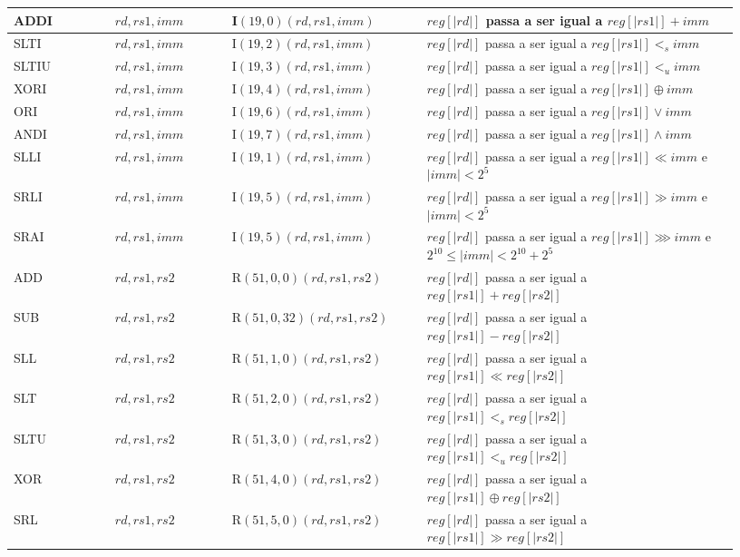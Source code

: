 \begin{table}
\begin{tabular}{ |p{0.13\linewidth}||p{0.15\linewidth}|p{0.25\linewidth}|p{0.40\linewidth}| }
ADDI & $rd, rs1, imm$ & I$(19, 0)(rd, rs1, imm)$ & $reg[|rd|]$ passa a ser igual a ${reg[|rs1|] + imm}$\\ \hline
SLTI & $rd, rs1, imm$ & I$(19, 2)(rd, rs1, imm)$ & $reg[|rd|]$ passa a ser igual a ${reg[|rs1|] <_s imm}$\\ \hline
SLTIU & $rd, rs1, imm$ & I$(19, 3)(rd, rs1, imm)$ & $reg[|rd|]$ passa a ser igual a ${reg[|rs1|] <_u imm}$\\ \hline
XORI & $rd, rs1, imm$ & I$(19, 4)(rd, rs1, imm)$ & $reg[|rd|]$ passa a ser igual a ${reg[|rs1|] \oplus imm}$\\ \hline
ORI & $rd, rs1, imm$ & I$(19, 6)(rd, rs1, imm)$ & $reg[|rd|]$ passa a ser igual a ${reg[|rs1|] \lor imm}$\\ \hline
ANDI & $rd, rs1, imm$ & I$(19, 7)(rd, rs1, imm)$ & $reg[|rd|]$ passa a ser igual a ${reg[|rs1|] \land imm}$ \\ \hline
SLLI & $rd, rs1, imm$ & I$(19, 1)(rd, rs1, imm)$ & $reg[|rd|]$ passa a ser igual a ${reg[|rs1|] \ll imm}$ e $|imm| < 2^5$ \\ \hline
SRLI & $rd, rs1, imm$ & I$(19, 5)(rd, rs1, imm)$ & $reg[|rd|]$ passa a ser igual a ${reg[|rs1|] \gg imm}$ e $|imm| < 2^5$\\ \hline
SRAI & $rd, rs1, imm$ & I$(19, 5)(rd, rs1, imm)$ & $reg[|rd|]$ passa a ser igual a ${reg[|rs1|] \ggg imm}$ e $2^{10} \leq |imm| < 2^{10} + 2^5$\\ \hline
ADD & $rd, rs1, rs2$ & R$(51, 0, 0)(rd, rs1, rs2)$ & $reg[|rd|]$ passa a ser igual a ${reg[|rs1|] + reg[|rs2|]}$ \\ \hline
SUB & $rd, rs1, rs2$ & R$(51, 0, 32)(rd, rs1, rs2)$ & $reg[|rd|]$ passa a ser igual a ${reg[|rs1|] - reg[|rs2|]}$ \\ \hline
SLL & $rd, rs1, rs2$ & R$(51, 1, 0)(rd, rs1, rs2)$ & $reg[|rd|]$ passa a ser igual a ${reg[|rs1|] \ll reg[|rs2|]}$ \\ \hline
SLT & $rd, rs1, rs2$ & R$(51, 2, 0)(rd, rs1, rs2)$ & $reg[|rd|]$ passa a ser igual a ${reg[|rs1|] <_s reg[|rs2|]}$ \\ \hline
SLTU & $rd, rs1, rs2$ & R$(51, 3, 0)(rd, rs1, rs2)$ & $reg[|rd|]$ passa a ser igual a ${reg[|rs1|] <_u reg[|rs2|]}$ \\ \hline
XOR & $rd, rs1, rs2$ & R$(51, 4, 0)(rd, rs1, rs2)$ & $reg[|rd|]$ passa a ser igual a ${reg[|rs1|] \oplus reg[|rs2|]}$ \\ \hline
SRL & $rd, rs1, rs2$ & R$(51, 5, 0)(rd, rs1, rs2)$ & $reg[|rd|]$ passa a ser igual a ${reg[|rs1|] \gg reg[|rs2|]}$ \\ \hline

\end{tabular}
\end{table}
